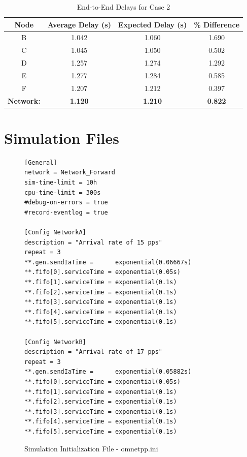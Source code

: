 \documentclass{article}
\begin{document}
\begin{appendices}
\begin{table}[h!]
\centering
\begin{tabular}{|c|c|c|c|} \hline
\textbf{Node} & \textbf{Average Delay (s)} & \textbf{Expected Delay (s)} & \textbf{\% Difference} \\ \hline
B & 1.042 & 1.060 & 1.690 \\ \hline
C & 1.045 & 1.050 & 0.502 \\ \hline
D & 1.257 & 1.274 & 1.292 \\ \hline
E & 1.277 & 1.284 & 0.585 \\ \hline
F & 1.207 & 1.212 & 0.397 \\ \hline
\textbf{Network:} & \textbf{1.120} & \textbf{1.210} & \textbf{0.822} \\ \hline
\end{tabular}
\caption{End-to-End Delays for Case 2}
\label{tab:nodeDelayB}
\end{table}

\newpage
\section{Simulation Files}
\label{appendix:SimFiles}

\begin{figure}[h!]
\begin{lstlisting}
[General]
network = Network_Forward
sim-time-limit = 10h
cpu-time-limit = 300s
#debug-on-errors = true
#record-eventlog = true

[Config NetworkA]
description = "Arrival rate of 15 pps"
repeat = 3
**.gen.sendIaTime = 	 exponential(0.06667s)
**.fifo[0].serviceTime = exponential(0.05s)
**.fifo[1].serviceTime = exponential(0.1s)
**.fifo[2].serviceTime = exponential(0.1s)
**.fifo[3].serviceTime = exponential(0.1s)
**.fifo[4].serviceTime = exponential(0.1s)
**.fifo[5].serviceTime = exponential(0.1s)

[Config NetworkB]
description = "Arrival rate of 17 pps"
repeat = 3
**.gen.sendIaTime = 	 exponential(0.05882s)
**.fifo[0].serviceTime = exponential(0.05s)
**.fifo[1].serviceTime = exponential(0.1s)
**.fifo[2].serviceTime = exponential(0.1s)
**.fifo[3].serviceTime = exponential(0.1s)
**.fifo[4].serviceTime = exponential(0.1s)
**.fifo[5].serviceTime = exponential(0.1s)
\end{lstlisting}
\vspace{-1cm}
\caption*{Simulation Initialization File - omnetpp.ini}
\end{figure}


\end{appendices}
\end{document}
